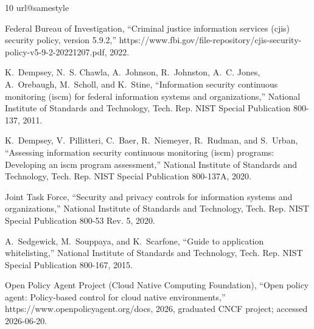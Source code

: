 \documentclass[journal]{IEEEtran}
\begin{document}
\begin{thebibliography}{10}
\providecommand{\url}[1]{#1}
\csname url@samestyle\endcsname
\providecommand{\newblock}{\relax}
\providecommand{\bibinfo}[2]{#2}
\providecommand{\BIBentrySTDinterwordspacing}{\spaceskip=0pt\relax}
\providecommand{\BIBentryALTinterwordstretchfactor}{4}
\providecommand{\BIBentryALTinterwordspacing}{\spaceskip=\fontdimen2\font plus
\BIBentryALTinterwordstretchfactor\fontdimen3\font minus
  \fontdimen4\font\relax}
\providecommand{\BIBforeignlanguage}[2]{{%
\expandafter\ifx\csname l@#1\endcsname\relax
\typeout{** WARNING: IEEEtran.bst: No hyphenation pattern has been}%
\typeout{** loaded for the language `#1'. Using the pattern for}%
\typeout{** the default language instead.}%
\else
\language=\csname l@#1\endcsname
\fi
#2}}
\providecommand{\BIBdecl}{\relax}
\BIBdecl

{Federal Bureau of Investigation}, ``Criminal justice information services
  (cjis) security policy, version 5.9.2,''
  \url{https://www.fbi.gov/file-repository/cjis-security-policy-v5-9-2-20221207.pdf},
  2022.

K.~Dempsey, N.~S. Chawla, A.~Johnson, R.~Johnston, A.~C. Jones, A.~Orebaugh,
  M.~Scholl, and K.~Stine, ``Information security continuous monitoring (iscm)
  for federal information systems and organizations,'' National Institute of
  Standards and Technology, Tech. Rep. NIST Special Publication 800-137, 2011.

K.~Dempsey, V.~Pillitteri, C.~Baer, R.~Niemeyer, R.~Rudman, and S.~Urban,
  ``Assessing information security continuous monitoring (iscm) programs:
  Developing an iscm program assessment,'' National Institute of Standards and
  Technology, Tech. Rep. NIST Special Publication 800-137A, 2020.

{Joint Task Force}, ``Security and privacy controls for information systems and
  organizations,'' National Institute of Standards and Technology, Tech. Rep.
  NIST Special Publication 800-53 Rev. 5, 2020.

A.~Sedgewick, M.~Souppaya, and K.~Scarfone, ``Guide to application
  whitelisting,'' National Institute of Standards and Technology, Tech. Rep.
  NIST Special Publication 800-167, 2015.

{Open Policy Agent Project (Cloud Native Computing Foundation)}, ``Open policy
  agent: Policy-based control for cloud native environments,''
  \url{https://www.openpolicyagent.org/docs}, 2026, graduated CNCF project;
  accessed 2026-06-20.


\end{thebibliography}
\end{document}
